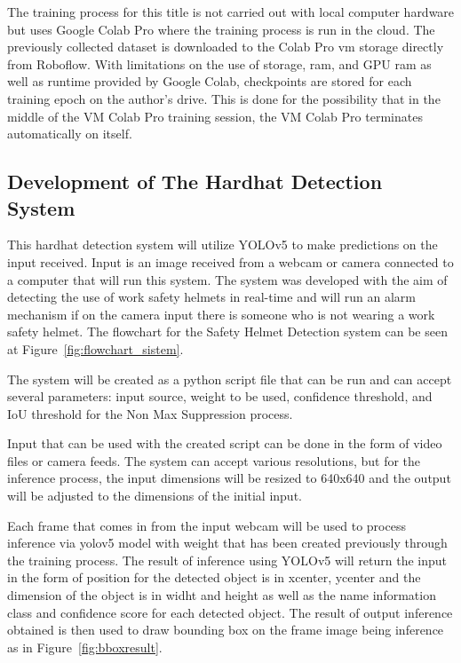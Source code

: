 \par The training process for this title is not carried out with local computer hardware but uses Google Colab Pro where the training process is run in the cloud. The previously collected dataset is downloaded to the Colab Pro vm storage directly from Roboflow. With limitations on the use of storage, ram, and GPU ram as well as runtime provided by Google Colab, checkpoints are stored for each training epoch on the author's drive. This is done for the possibility that in the middle of the VM Colab Pro training session, the VM Colab Pro terminates automatically on itself. 

\subsection{Development of The Hardhat Detection System}
\label{subsec:perancangansistemdeteksihelmkeselamatankerja}

\par This hardhat detection system will utilize YOLOv5 to make predictions on the input received. Input is an image received from a webcam or camera connected to a computer that will run this system. The system was developed with the aim of detecting the use of work safety helmets in real-time and will run an alarm mechanism if on the camera input there is someone who is not wearing a work safety helmet. The flowchart for the Safety Helmet Detection system can be seen at Figure~\ref{fig:flowchart_sistem}.

\par The system will be created as a python script file that can be run and can accept several parameters: input source, weight to be used, confidence threshold, and IoU threshold for the Non Max Suppression process.

\par Input that can be used with the created script can be done in the form of video files or camera feeds. The system can accept various resolutions, but for the inference process, the input dimensions will be resized to 640x640 and the output will be adjusted to the dimensions of the initial input.

\par Each frame that comes in from the input webcam will be used to process inference via
yolov5 model with weight that has been created previously through the training process.
The result of inference using YOLOv5 will return the input in the form of position for
the detected object is in xcenter, ycenter and the dimension of the object is in widht
and height as well as the name information class and confidence score for
each detected object. The result of output inference obtained is then used to draw
bounding box on the frame image being inference
as in Figure~\ref{fig:bboxresult}.

